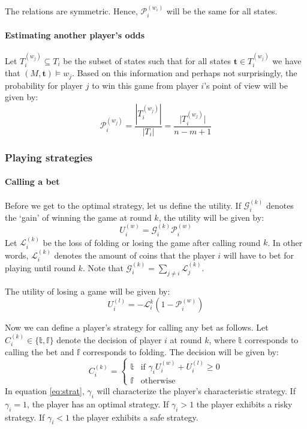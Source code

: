 \documentclass[a4paper,10pt]{article}
\begin{document}
The relations are symmetric. Hence, $\mathcal{P}^{(w_i)}_i$ will be the same for all states.

\paragraph{Estimating another player's odds}
Let $T^{(w_j)}_i \subseteq T_i$ be the subset of states such that for all states $\boldsymbol t \in T^{(w_j)}_i$ we have that $(M,\boldsymbol t) \models w_j$. Based on this information and perhaps not surprisingly, the probability for player $j$ to win this game from player $i$'s point of view will be given by:
\begin{equation}
\mathcal{P}^{(w_j)}_i = \frac{|T^{(w_j)}_i|}{|T_i|} = \frac{\lvert T^{(w_j)}_i\rvert}{n-m+1} \label{eq:prob}
\end{equation}


\subsubsection{Playing strategies}
\paragraph{Calling a bet}
Before we get to the optimal strategy, let us define the utility. If $\mathcal G^{(k)}_i$ denotes the `gain' of winning the game at round $k$, the utility will be given by:
\begin{equation}
 U^{(w)}_i = \mathcal G^{(k)}_i \mathcal P^{(w)}_i
\label{eq:util}
 \end{equation}
Let $\mathcal{L}^{(k)}_i$ be the loss of folding or losing the game after calling round $k$. In other words, $\mathcal L^{(k)}_i$ denotes the amount of coins that the player $i$ will have to bet for playing until round $k$. Note that $\displaystyle \mathcal G^{(k)}_i = \sum_{j\neq i} \mathcal L^{(k)}_j$. 

The utility of losing a game will be given by:
\begin{equation}
 U^{(l)}_i = -\mathcal L^{k}_i (1-\mathcal P^{(w)}_i)
\end{equation}

Now we can define a player's strategy for calling any bet as follows. Let $C_i^{(k)} \in \{\mathbb t, \mathbb f\}$ denote the decision of player $i$ at round $k$, where $\mathbb t$ corresponds to calling the bet and $\mathbb f$ corresponds to folding. The decision will be given by:
\begin{equation}
C_i^{(k)}  =
\begin{cases}
 \mathbb t & \text{if } \gamma_i U^{(w)}_i + U^{(l)}_i \geq 0\\
 \mathbb f & \text{otherwise}
\end{cases}
\label{eq:strat}
\end{equation}
In equation \ref{eq:strat}, $\gamma_i$ will characterize the player's characteristic strategy. If $\gamma_i = 1$, the player has an optimal strategy. If $\gamma_i > 1$ the player exhibits a risky strategy. If $\gamma_i < 1$ the player exhibits a safe strategy.
\end{document}
